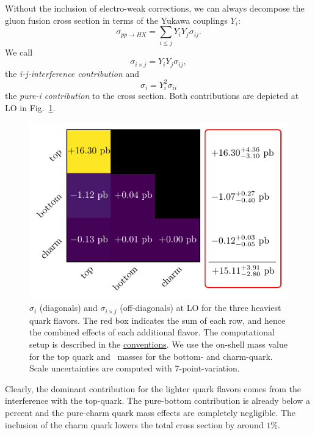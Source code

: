 Without the inclusion of electro-weak corrections, we can always decompose the gluon fusion cross section in terms of the Yukawa couplings $Y_i$:
\begin{equation}
\sigma_{pp \rightarrow HX} =  \sum_{i\le j} Y_i Y_j \sigma_{i j}.
\end{equation}
We call
\begin{equation}
\sigma_{i \times j} = Y_i Y_j \sigma_{ij},
\end{equation}
the \textit{i-j-interference contribution} and
\begin{equation}
\sigma_{i} = Y_i^2 \sigma_{ii}
\end{equation}
the \textit{pure-i contribution} to the cross section. Both contributions are depicted at \acs{LO} in Fig.~\ref{fig:4:quark_effects}.
\begin{figure}[h]
\centering
\includegraphics[scale=0.9]{Images/quark_effects_LO.pdf}
\caption{$\sigma_{i}$ (diagonals) and $\sigma_{i \times j}$ (off-diagonals) at \acs{LO} for the three heaviest quark flavors. The red box indicates the sum of each row, and hence the combined effects of each additional flavor. The computational setup is described in the \hyperref[chap:notation_and_conventions]{conventions}. We use the on-shell mass value for the top quark and \MS\ masses for the bottom- and charm-quark. Scale uncertainties are computed with 7-point-variation.}
\label{fig:4:quark_effects}
\end{figure}
Clearly, the dominant contribution for the lighter quark flavors comes from the interference with the top-quark. The pure-bottom contribution is already below a percent and the pure-charm quark mass effects are completely negligible. The inclusion of the charm quark lowers the total cross section by around $1\%$.


